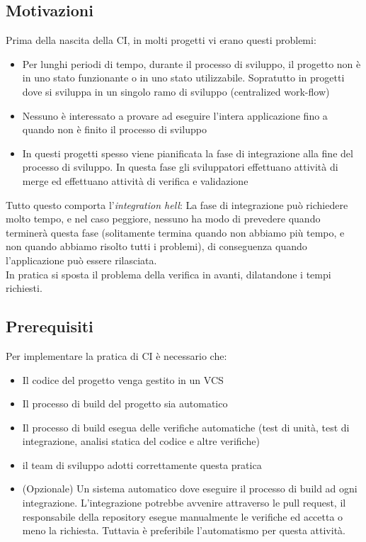 \documentclass[10pt, a4paper]{article}
\begin{document}
\subsection{Motivazioni}
Prima della nascita della CI, in molti progetti vi erano questi problemi:
\begin{itemize}
    \item Per lunghi periodi di tempo, durante il processo di sviluppo, il progetto non è in uno
stato funzionante o in uno stato utilizzabile. Sopratutto in progetti dove si sviluppa in un
singolo ramo di sviluppo (centralized work-flow)
    \item Nessuno è interessato a provare ad eseguire l'intera applicazione fino a quando non è
finito il processo di sviluppo
    \item In questi progetti spesso viene pianificata la fase di integrazione alla fine del processo di
sviluppo. In questa fase gli sviluppatori effettuano attività di merge ed effettuano attività di
verifica e validazione
\end{itemize}
Tutto questo comporta l'\textit{integration hell}: La fase di integrazione può richiedere molto tempo, e nel caso peggiore, nessuno ha modo di prevedere quando terminerà questa fase (solitamente termina quando non abbiamo più tempo, e non quando abbiamo risolto tutti i problemi), di conseguenza quando l'applicazione può essere rilasciata.\\
In pratica si sposta il problema della verifica in avanti, dilatandone i tempi richiesti.

\subsection{Prerequisiti}
Per implementare la pratica di CI è necessario che:
\begin{itemize}
    \item Il codice del progetto venga gestito in un VCS
    \item Il processo di build del progetto sia automatico
    \item Il processo di build esegua delle verifiche automatiche (test di unità, test di integrazione, analisi statica del codice e altre verifiche)
    \item il team di sviluppo adotti correttamente questa pratica
    \item (Opzionale) Un sistema automatico dove eseguire il processo di build ad ogni integrazione. L'integrazione potrebbe avvenire attraverso le pull request, il responsabile della repository esegue manualmente le verifiche ed accetta o meno la richiesta. Tuttavia è preferibile l'automatismo per questa attività.
\end{itemize}
\end{document}
